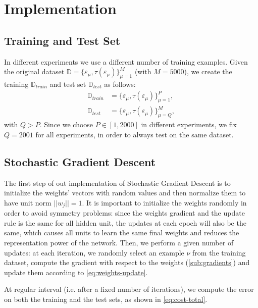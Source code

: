 \section{Implementation}
\label{sec:implementation}

\subsection{Training and Test Set}
In different experiments we use a different number of training examples.
Given the original dataset $\mathbb{D} = \{ \varepsilon_\mu, \tau(\varepsilon_\mu)\}_{\mu=1}^M$ (with $M = 5000$), we create the training $\mathbb{D}_{train}$ and test set $\mathbb{D}_{test}$ as follows:
\begin{equation*}
    \begin{split}
        \mathbb{D}_{train} &= \{ \varepsilon_\mu, \tau(\varepsilon_\mu)\}_{\mu=1}^P, \\
        \mathbb{D}_{test} &= \{ \varepsilon_\mu, \tau(\varepsilon_\mu)\}_{\mu=Q}^M,
    \end{split}
\end{equation*}
with $Q > P$.
Since we choose $P \in [1, 2000]$ in different experiments, we fix $Q = 2001$ for all experiments, in order to always test on the same dataset. 

\subsection{Stochastic Gradient Descent}
The first step of out implementation of Stochastic Gradient Descent is to initialize the weights' vectors with random values and then normalize them to have unit norm $||w_j|| = 1$.
It is important to initialize the weights randomly in order to avoid symmetry problems:
since the weights gradient and the update rule is the same for all hidden unit, the updates at each epoch will also be the same, which causes all units to learn the same final weights and reduces the representation power of the network.
Then, we perform a given number of updates:
at each iteration, we randomly select an example $\nu$ from the training dataset, compute the gradient with respect to the weights (\cref{sub:gradients}) and update them according to \cref{eq:weights-update}.

At regular interval (i.e. after a fixed number of iterations), we compute the error on both the training and the test sets, as shown in \cref{eq:cost-total}.

